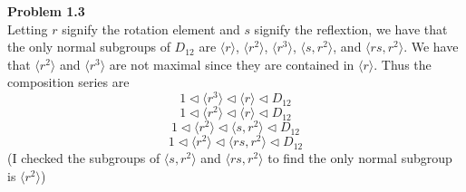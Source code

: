 \documentclass[12pt]{article}
\newenvironment{ques}[1]{\textbf{Problem #1}\vspace{1 mm}\\ }{\bigskip}
\theoremstyle{definition}
\begin{document}
\begin{ques}{1.3}
	Letting $r$ signify the rotation element and $s$ signify the reflextion, we
	have that the only normal subgroups of $D_{12}$ are $\langle r \rangle$,
	$\langle r^2 \rangle$, $\langle r^3 \rangle$, $\langle s, r^2 \rangle$, and
	$\langle rs, r^2 \rangle$. We have that $\langle r^2 \rangle$ and $\langle
	r^3 \rangle$ are not maximal since they are contained in $\langle r
	\rangle$. Thus the composition series are
	$$1 \lhd \langle r^3 \rangle \lhd \langle r\rangle\lhd D_{12}$$
	$$1 \lhd \langle r^2 \rangle \lhd \langle r \rangle \lhd  D_{12}$$
	$$1 \lhd \langle r^2 \rangle \lhd \langle s,r^2 \rangle \lhd  D_{12}$$
	$$1 \lhd \langle r^2 \rangle \lhd \langle rs,r^2 \rangle \lhd  D_{12}$$
	(I checked the subgroups of $\langle s,r^2 \rangle$ and $\langle rs,r^2
	\rangle$ to find the only normal subgroup is $\langle r^2 \rangle$)

\end{ques}
\end{document}
